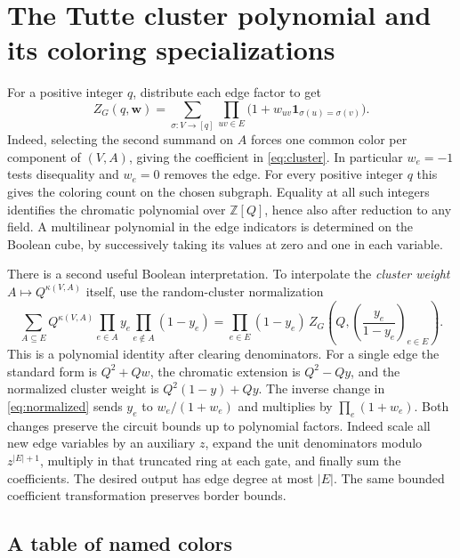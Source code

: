 \documentclass[11pt]{article}
\theoremstyle{definition}
\newcommand{\one}{\mathbf{1}}
\begin{document}
\section{The Tutte cluster polynomial and its coloring specializations}\label{sec:color}

For a positive integer \(q\), distribute each edge factor to get
\begin{equation}\label{eq:potts}
 Z_G(q,\mathbf w)=\sum_{\sigma:V\to[q]}
               \prod_{uv\in E}\bigl(1+w_{uv}\one_{\sigma(u)=\sigma(v)}\bigr).
\end{equation}
Indeed, selecting the second summand on \(A\) forces one common color per component of \((V,A)\), giving the coefficient in \eqref{eq:cluster}. In particular \(w_e=-1\) tests disequality and \(w_e=0\) removes the edge. For every positive integer \(q\) this gives the coloring count on the chosen subgraph. Equality at all such integers identifies the chromatic polynomial over \(\mathbb Z[Q]\), hence also after reduction to any field. A multilinear polynomial in the edge indicators is determined on the Boolean cube, by successively taking its values at zero and one in each variable.

There is a second useful Boolean interpretation. To interpolate the \emph{cluster weight} \(A\mapsto Q^{\kappa(V,A)}\) itself, use the random-cluster normalization
\begin{equation}\label{eq:normalized}
 \sum_{A\subseteq E}Q^{\kappa(V,A)}
       \prod_{e\in A} y_e\prod_{e\notin A}(1-y_e)
    =\prod_{e\in E}(1-y_e)\,Z_G\!\left(Q,\left(\frac{y_e}{1-y_e}\right)_{e\in E}\right).
\end{equation}
This is a polynomial identity after clearing denominators. For a single edge the standard form is \(Q^2+Qw\), the chromatic extension is \(Q^2-Qy\), and the normalized cluster weight is \(Q^2(1-y)+Qy\). The inverse change in \eqref{eq:normalized} sends \(y_e\) to \(w_e/(1+w_e)\) and multiplies by \(\prod_e(1+w_e)\). Both changes preserve the circuit bounds up to polynomial factors. Indeed scale all new edge variables by an auxiliary \(z\), expand the unit denominators modulo \(z^{|E|+1}\), multiply in that truncated ring at each gate, and finally sum the coefficients. The desired output has edge degree at most \(|E|\). The same bounded coefficient transformation preserves border bounds.

\subsection{A table of named colors}
\end{document}
